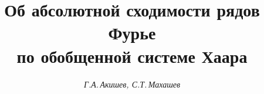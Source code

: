 

 




 


\newcommand{\col}{\operatorname{col}} 


\newcommand{\tts}[1]{} 


\renewcommand{\baselinestretch}{1.05}


 




\setcounter{page}{8} 












 


\author{\it Г.А.\,Акишев, С.Т.\,Махашев } 




\title{Об абсолютной сходимости рядов Фурье\\


по обобщенной системе Хаара} 


 


\date{} 




\pagestyle{plain} %


 




\maketitle 


